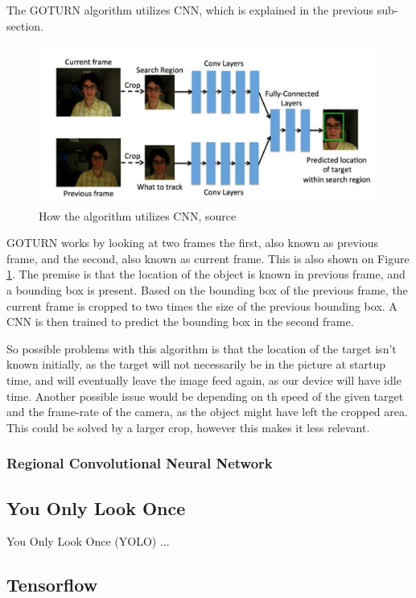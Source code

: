 The GOTURN algorithm utilizes CNN, which is explained in the previous sub-section.
\begin{figure}[H]
	\centering
	\includegraphics[scale=0.80]{images/GOTURN-architecture.jpg}
	\caption{
		How the algorithm utilizes CNN, source \cite{goturn}
	}
	\label{fig:goturn-arch}
\end{figure}
GOTURN works by looking at two frames the first, also known as previous frame, and the second, also known as current frame.
This is also shown on Figure \ref{fig:goturn-arch}.
The premise is that the location of the object is known in previous frame, and a bounding box is present.
Based on the bounding box of the previous frame, the current frame is cropped to two times the size of the previous bounding box.
A CNN is then trained to predict the bounding box in the second frame.


So possible problems with this algorithm is that the location of the target isn't known initially, as the target will not necessarily be in the picture at startup time, and will eventually leave the image feed again, as our device will have idle time.
Another possible issue would be depending on th speed of the given target and the frame-rate of the camera, as the object might have left the cropped area. 
This could be solved by a larger crop, however this makes it less relevant.



\subsubsection{Regional Convolutional Neural Network}

\subsection{You Only Look Once}
You Only Look Once (YOLO) ...

\subsection{Tensorflow}


